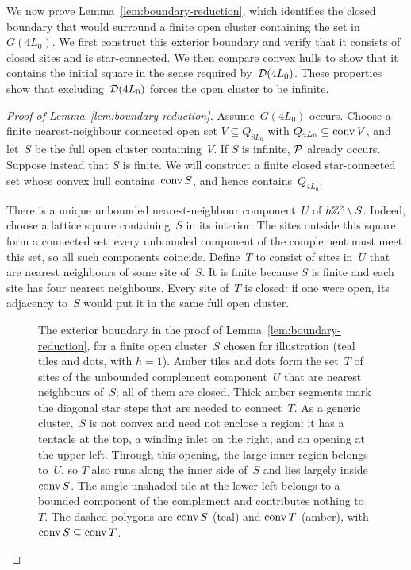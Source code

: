\documentclass[11pt,letterpaper]{article}
\begin{document}
We now prove Lemma~\ref{lem:boundary-reduction}, which identifies the closed boundary that would surround a finite open cluster containing the set in~$G(4L_0)$. We first construct this exterior boundary and verify that it consists of closed sites and is star-connected. We then compare convex hulls to show that it contains the initial square in the sense required by~$\mathcal D(4L_0)$. These properties show that excluding~$\mathcal D(4L_0)$ forces the open cluster to be infinite.

\begin{proof}[Proof of Lemma~\ref{lem:boundary-reduction}]
Assume~$G(4L_0)$ occurs. Choose a finite nearest-neighbour connected open set $V\subseteq Q_{8L_0}$ with $Q_{4L_0}\subseteq\operatorname{conv} V$, and let~$S$ be the full open cluster containing~$V$. If $S$ is infinite, $\mathcal P$ already occurs. Suppose instead that $S$ is finite. We will construct a finite closed star-connected set whose convex hull contains~$\operatorname{conv} S$, and hence contains~$Q_{4L_0}$.

There is a unique unbounded nearest-neighbour component~$U$ of $h\mathbb Z^2\setminus S$. Indeed, choose a lattice square containing~$S$ in its interior. The sites outside this square form a connected set; every unbounded component of the complement must meet this set, so all such components coincide. Define~$T$ to consist of sites in~$U$ that are nearest neighbours of some site of~$S$. It is finite because $S$ is finite and each site has four nearest neighbours. Every site of~$T$ is closed: if one were open, its adjacency to~$S$ would put it in the same full open cluster.

\begin{figure}[ht]
  \centering
  
  \caption{The exterior boundary in the proof of Lemma~\ref{lem:boundary-reduction}, for a finite open cluster~$S$ chosen for illustration (teal tiles and dots, with $h=1$). Amber tiles and dots form the set~$T$ of sites of the unbounded complement component~$U$ that are nearest neighbours of~$S$; all of them are closed. Thick amber segments mark the diagonal star steps that are needed to connect~$T$. As a generic cluster,~$S$ is not convex and need not enclose a region: it has a tentacle at the top, a winding inlet on the right, and an opening at the upper left. Through this opening, the large inner region belongs to~$U$, so $T$ also runs along the inner side of~$S$ and lies largely inside~$\operatorname{conv} S$. The single unshaded tile at the lower left belongs to a bounded component of the complement and contributes nothing to~$T$. The dashed polygons are $\operatorname{conv} S$ (teal) and $\operatorname{conv} T$ (amber), with $\operatorname{conv} S\subseteq\operatorname{conv} T$.}
  \label{fig:boundary}
\end{figure}


\end{proof}
\end{document}
